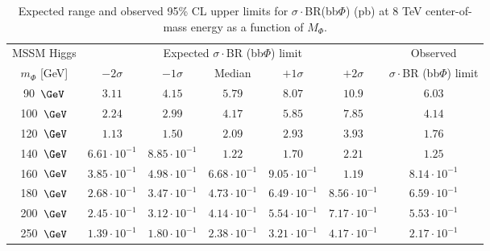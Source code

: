 \clearpage

\begin{table}[!h]
  \begin{center}
    \caption{Expected range and observed 95\% CL upper limits for $\sigma\cdot$BR(bb$\Phi$) (pb) at 8 TeV center-of-mass energy as a function of $M_{\Phi}$.}
{\small
\begin{tabular}{|c|c|c|c|c|c|c|}
\cline{2-7}
\multicolumn{1}{c}{MSSM Higgs}      & \multicolumn{5}{|c|}{Expected $\sigma\cdot$BR (bb$\Phi$) limit} & Observed \\
\cline{1-6}
  $m_{\Phi}$ [GeV] &$-2\sigma$  &   $-1\sigma$ &        Median &    $+1\sigma$ &  $+2\sigma$ & $\sigma\cdot$BR (bb$\Phi$) limit \\ 
\hline
                90~$\GeV$ &               $3.11$ &               $4.15$ &               $5.79$ &               $8.07$ &               $10.9$ &               $6.03$  \\
\hline
               100~$\GeV$ &               $2.24$ &               $2.99$ &               $4.17$ &               $5.85$ &               $7.85$ &               $4.14$  \\
\hline
               120~$\GeV$ &               $1.13$ &               $1.50$ &               $2.09$ &               $2.93$ &               $3.93$ &               $1.76$  \\
\hline
               140~$\GeV$ &               $6.61 \cdot 10^{-1}$ &               $8.85 \cdot 10^{-1}$ &               $1.22$ &               $1.70$ &               $2.21$ &               $1.25$  \\
\hline
               160~$\GeV$ &               $3.85 \cdot 10^{-1}$ &               $4.98 \cdot 10^{-1}$ &               $6.68 \cdot 10^{-1}$ &               $9.05 \cdot 10^{-1}$ &               $1.19$ &               $8.14 \cdot 10^{-1}$  \\
\hline
               180~$\GeV$ &               $2.68 \cdot 10^{-1}$ &               $3.47 \cdot 10^{-1}$ &               $4.73 \cdot 10^{-1}$ &               $6.49 \cdot 10^{-1}$ &               $8.56 \cdot 10^{-1}$ &               $6.59 \cdot 10^{-1}$  \\
\hline
               200~$\GeV$ &               $2.45 \cdot 10^{-1}$ &               $3.12 \cdot 10^{-1}$ &               $4.14 \cdot 10^{-1}$ &               $5.54 \cdot 10^{-1}$ &               $7.17 \cdot 10^{-1}$ &               $5.53 \cdot 10^{-1}$  \\
\hline
               250~$\GeV$ &               $1.39 \cdot 10^{-1}$ &               $1.80 \cdot 10^{-1}$ &               $2.38 \cdot 10^{-1}$ &               $3.21 \cdot 10^{-1}$ &               $4.17 \cdot 10^{-1}$ &               $2.17 \cdot 10^{-1}$  \\

\end{tabular}}
\end{center}
\end{table}
